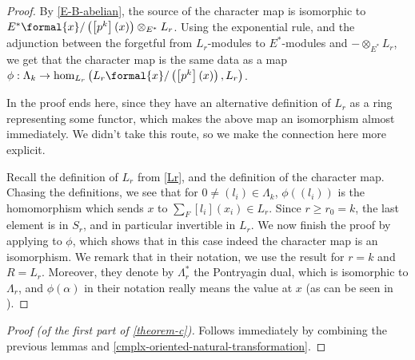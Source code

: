\begin{proof}
	By \ref{E-B-abelian}, the source of the character map is isomorphic to $E^*\formal{x}/\left(\left[p^k\right]\left(x\right)\right) \otimes_{E^*} L_r$.
	Using the exponential rule, and the adjunction between the forgetful from $L_r$-modules to $E^*$-modules and $- \otimes_{E^*} L_r$, we get that the character map is the same data as a map
	$\phi: \Lambda_k \to \hom_{L_r}\left(L_r\formal{x}/\left(\left[p^k\right]\left(x\right)\right), L_r\right)$.
	
	In \cite{HKR} the proof ends here, since they have an alternative definition of $L_r$ as a ring representing some functor, which makes the above map an isomorphism almost immediately.
	We didn't take this route, so we make the connection here more explicit.
	
	Recall the definition of $L_r$ from \ref{Lr}, and the definition of the character map.
	Chasing the definitions, we see that for $0 \neq \left(l_i\right) \in \Lambda_k$, $\phi\left(\left(l_i\right)\right)$ is the homomorphism which sends $x$ to $\sum_F \left[l_i\right]\left(x_i\right) \in L_r$.
	Since $r \geq r_0 = k$, the last element is in $S_r$, and in particular invertible in $L_r$.
	We now finish the proof by applying \cite[6.2]{HKR} to $\phi$, which shows that in this case indeed the character map is an isomorphism.
	We remark that in their notation, we use the result for $r = k$ and $R = L_r$.
	Moreover, they denote by $\Lambda_r^*$ the Pontryagin dual, which is isomorphic to $\Lambda_r$, and $\phi\left(\alpha\right)$ in their notation really means the value at $x$ (as can be seen in \cite[5.5]{HKR}).
\end{proof}

\begin{proof}[Proof (of the first part of \ref{theorem-c})]
	Follows immediately by combining the previous lemmas and \ref{cmplx-oriented-natural-transformation}.
\end{proof}
